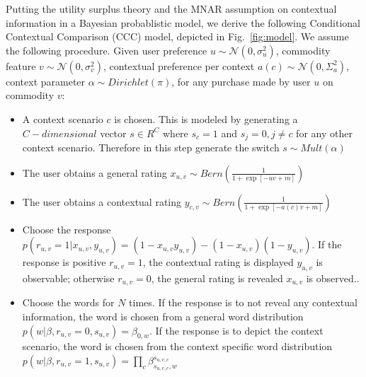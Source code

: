 \documentclass{llncs}
\begin{document}
Putting the utility surplus theory and the MNAR assumption on contextual information in a Bayesian probablistic model, we derive the following Conditional Contextual Comparison (CCC) model, depicted in Fig.~\ref{fig:model}. We assume the following procedure. Given user preference $u\sim \mathcal{N}(0,\sigma_u^2)$, commodity feature $v\sim \mathcal{N}(0,\sigma_v^2)$, contextual preference per context $a(c)\sim \mathcal{N}(0,\Sigma_a^2)$, context parameter $\alpha\sim Dirichlet(\pi)$, for any purchase made by user $u$ on commodity $v$:
\begin{itemize}
\item A context scenario $c$ is chosen. This is modeled by generating a $C-dimensional$ vector $s\in R^C$  where $s_c=1$ and $s_j=0,j\neq c$ for any other context scenario. Therefore in this step generate the switch $s\sim Mult(\alpha) $
\item The user obtains a general rating $x_{u,v}\sim Bern(\frac{1}{1+\exp{[-uv + m ]}})$
\item The user obtains a contextual rating $y_{c,v}\sim Bern( \frac{1}{1+\exp{[-a(c) v+m]}})$
\item Choose the response $p(r_{u,v}=1|x_{u,v},y_{u,v})=(1-x_{u,v}y_{u,v})-(1-x_{u,v})(1-y_{u,v})$. If the response is positive $r_{u,v}=1$, the contextual rating is displayed $y_{u,v}$ is observable; otherwise  $r_{u,v}=0$, the general rating is revealed $x_{u,v}$ is observed..
\item Choose the words for $N$ times. If the response is to not reveal any contextual information, the word is chosen from a general word distribution $p(w|\beta,r_{u,v}=0,s_{u,v})=\beta_{0,w}$. If the response is to depict the context scenario, the word is chosen from the context specific word distribution $p(w|\beta,r_{u,v}=1,s_{u,v})=\prod_c  \beta_{s_{u,v,c},w}^{s_{u,v,c}}$
\end{itemize}

\end{document}
